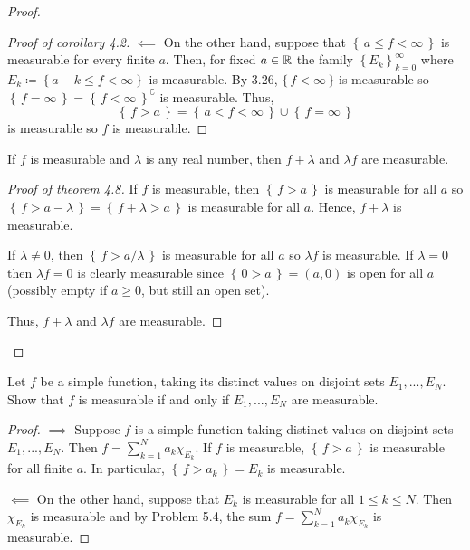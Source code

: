 \begin{proof}
\begin{proof}[Proof of corollary 4.2]
$\impliedby$ On the other hand, suppose that $\left\{\,a\leq
  f<\infty\,\right\}$ is measurable for every finite $a$. Then, for fixed
$a\in\mathbb{R}$ the family $\left\{E_k\right\}_{k=0}^\infty$ where
$E_k\coloneqq\left\{a-k\leq f<\infty\right\}$ is measurable. By 3.26,
$\{\,f<\infty\,\}$ is measurable so
$\left\{\,f=\infty\,\right\}=\left\{\,f<\infty\,\right\}^\complement$ is
measurable. Thus,
\[
\left\{\,f>a\,\right\}=\left\{\,a<f<\infty\,\right\}\cup\left\{\,f=\infty\,\right\}
\]
is measurable so $f$ is measurable.
\end{proof}
\begin{theorem*}
If $f$ is measurable and $\lambda$ is any real number, then $f+\lambda$ and
$\lambda f$ are measurable.
\end{theorem*}
\begin{proof}[Proof of theorem 4.8]
\renewcommand\qedsymbol{$\clubsuit$}
If $f$ is measurable, then $\left\{\,f>a\,\right\}$ is measurable for all
$a$ so $\left\{\,f>a-\lambda\,\right\}=\left\{\,f+\lambda>a\,\right\}$ is
measurable for all $a$. Hence, $f+\lambda$ is measurable.

If $\lambda\neq 0$, then $\left\{\,f>a/\lambda\,\right\}$ is measurable for
all $a$ so $\lambda f$ is measurable. If $\lambda=0$ then $\lambda f=0$ is
clearly measurable since $\left\{\,0>a\,\right\}=(a,0)$ is open for all
$a$ (possibly empty if $a\geq 0$, but still an open set).

Thus, $f+\lambda$ and $\lambda f$ are measurable.
\end{proof}
\end{proof}
\newpage

\begin{problem}
Let $f$ be a simple function, taking its distinct values on disjoint sets
$E_1,...,E_N$. Show that $f$ is measurable if and only if $E_1,...,E_N$ are
measurable.
\end{problem}
\begin{proof}
$\implies$ Suppose $f$ is a simple function taking distinct values on
disjoint sets $E_1,...,E_N$. Then $f=\sum_{k=1}^N a_k\chi_{E_k}$. If $f$ is
measurable, $\left\{\,f>a\,\right\}$ is measurable for all finite $a$. In
particular, $\left\{\,f>a_k\,\right\}=E_k$ is measurable.

$\impliedby$ On the other hand, suppose that $E_k$ is measurable for all
$1\leq k\leq N$. Then $\chi_{E_k}$ is measurable and by Problem 5.4, the
sum $f=\sum_{k=1}^N a_k\chi_{E_k}$ is measurable.
\end{proof}

